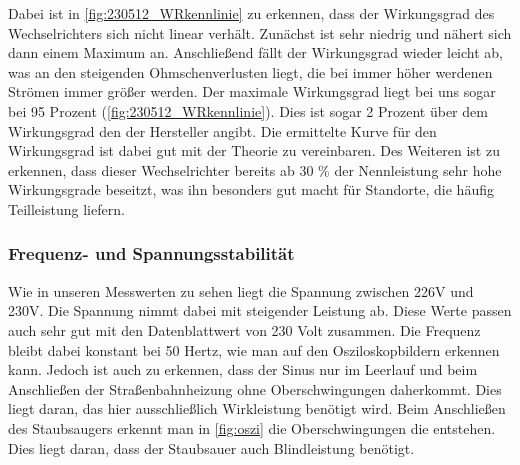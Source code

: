 Dabei ist in \autoref{fig:230512_WRkennlinie} zu erkennen, dass der Wirkungsgrad des Wechselrichters sich nicht linear verhält. Zunächst ist sehr niedrig und nähert sich dann einem Maximum an. Anschließend fällt der Wirkungsgrad wieder leicht ab, was an den steigenden Ohmschenverlusten liegt, die bei immer höher werdenen Strömen immer größer werden. Der maximale Wirkungsgrad liegt bei uns sogar bei 95 Prozent (\autoref{fig:230512_WRkennlinie}). Dies ist sogar 2 Prozent über dem Wirkungsgrad den der Hersteller angibt. Die ermittelte Kurve für den Wirkungsgrad ist dabei gut mit der Theorie zu vereinbaren. Des Weiteren ist zu erkennen, dass dieser Wechselrichter bereits ab 30 \% der Nennleistung sehr hohe Wirkungsgrade beseitzt, was ihn besonders gut macht für Standorte, die häufig Teilleistung liefern.
\subsubsection{Frequenz- und Spannungsstabilität}
Wie in unseren Messwerten zu sehen liegt die Spannung zwischen 226V und 230V. 
Die Spannung nimmt dabei mit steigender Leistung ab. 
Diese Werte passen auch sehr gut mit den Datenblattwert von 230 Volt zusammen. 
Die Frequenz bleibt dabei konstant bei 50 Hertz, wie man auf den Osziloskopbildern erkennen kann. 
Jedoch ist auch zu erkennen, dass der Sinus nur im Leerlauf und beim Anschließen der Straßenbahnheizung ohne Oberschwingungen daherkommt. 
Dies liegt daran, das hier ausschließlich Wirkleistung benötigt wird. 
Beim Anschließen des Staubsaugers erkennt man in \autoref{fig:oszi} die Oberschwingungen die entstehen. 
Dies liegt daran, dass der Staubsauer auch Blindleistung benötigt.
%
%

